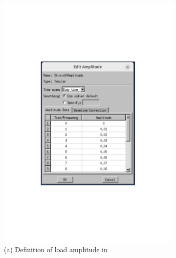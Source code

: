 \begin{figure}[H]
    \centering
    \begin{subfigure}[t]{0.35\textwidth}
        \centering
        \includegraphics[width=\linewidth]{Amplitude.pdf}
        \vfill{}
        \caption*{(a) Definition of load amplitude in } %
        \label{fig:amplitudemenu}
    \end{subfigure}
    \hspace{0.08\textwidth}
    \begin{subfigure}[t]{0.35\textwidth}
        \centering

\end{subfigure}
\end{figure}
